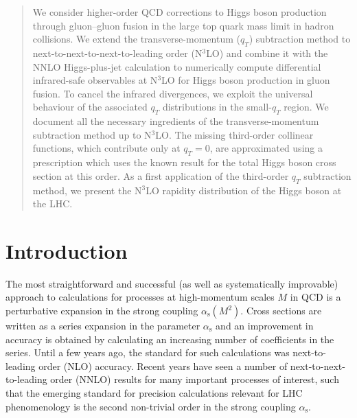 \documentclass[12pt]{article}
\DeclareRobustCommand{\as}{\ensuremath{\alpha_{\mathrm{s}}}}
\DeclareRobustCommand{\qt}{q_T}
\begin{document}
\begin{titlepage}
\begin{quote}
We consider higher-order QCD corrections to Higgs boson production through gluon--gluon fusion in the large top quark mass limit in hadron collisions. We extend the transverse-momentum ($q_T$) subtraction method to next-to-next-to-next-to-leading order (N$^{3}$LO) and combine it with the NNLO Higgs-plus-jet calculation to numerically compute differential infrared-safe observables at N$^{3}$LO for Higgs boson production in gluon fusion. To cancel the infrared divergences, we exploit the universal behaviour of the associated $\qt$ distributions in the small-$\qt$ region. We document all the necessary ingredients of the transverse-momentum subtraction method up to N$^{3}$LO. The missing third-order collinear functions, which contribute only at $\qt=0$, are approximated using a prescription which uses the known result for the total Higgs boson cross section at this order. As a first application of the third-order $\qt$ subtraction method, we present the  N$^{3}$LO rapidity distribution of the Higgs boson at the LHC.

\end{quote}
\end{titlepage}
\setcounter{footnote}{1}
\renewcommand{\thefootnote}{\fnsymbol{footnote}}
\section{Introduction}
\label{sec:intro}
The most straightforward and successful (as well as systematically improvable) approach to calculations for processes at high-momentum scales $M$ in QCD is a perturbative expansion in the strong coupling $\as(M^{2})$. Cross sections are written as a series expansion in the parameter $\as$ and an improvement in accuracy is obtained by calculating an increasing number of coefficients in the series. Until a few years ago, the standard for such calculations was next-to-leading order (NLO) accuracy. Recent years have seen a number of next-to-next-to-leading order (NNLO) results for many important processes of interest, such that the emerging standard for precision calculations relevant for LHC phenomenology is the second non-trivial order in the strong coupling $\as$.
\end{document}
